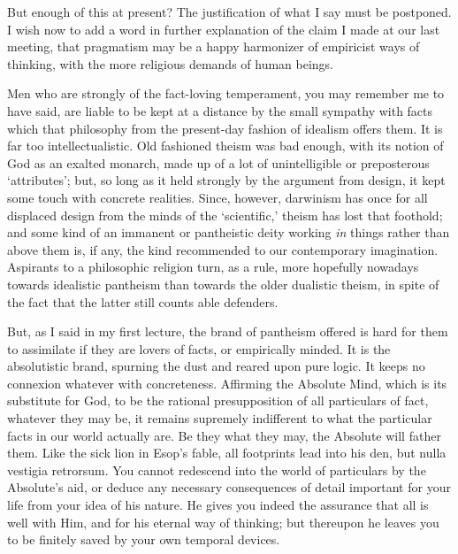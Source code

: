 \documentclass[]{article}
\begin{document}
But enough of this at present? The justification of what I say must be
postponed. I wish now to add a word in further explanation of the claim
I made at our last meeting, that pragmatism may be a happy harmonizer
of empiricist ways of thinking, with the more religious demands of human
beings.

Men who are strongly of the fact-loving temperament, you may remember me
to have said, are liable to be kept at a distance by the small sympathy
with facts which that philosophy from the present-day fashion of
idealism offers them. It is far too intellectualistic. Old fashioned
theism was bad enough, with its notion of God as an exalted monarch,
made up of a lot of unintelligible or preposterous `attributes'; but, so
long as it held strongly by the argument from design, it kept some touch
with concrete realities. Since, however, darwinism has once for all
displaced design from the minds of the `scientific,' theism has lost
that foothold; and some kind of an immanent or pantheistic deity working
\emph{in} things rather than above them is, if any, the kind recommended to our
contemporary imagination. Aspirants to a philosophic religion turn, as a
rule, more hopefully nowadays towards idealistic pantheism than towards
the older dualistic theism, in spite of the fact that the latter still
counts able defenders.

But, as I said in my first lecture, the brand of pantheism offered is
hard for them to assimilate if they are lovers of facts, or empirically
minded. It is the absolutistic brand, spurning the dust and reared upon
pure logic. It keeps no connexion whatever with concreteness. Affirming
the Absolute Mind, which is its substitute for God, to be the rational
presupposition of all particulars of fact, whatever they may be, it
remains supremely indifferent to what the particular facts in our world
actually are. Be they what they may, the Absolute will father them. Like
the sick lion in Esop's fable, all footprints lead into his den,
but nulla vestigia retrorsum. You cannot redescend into the world of
particulars by the Absolute's aid, or deduce any necessary consequences
of detail important for your life from your idea of his nature. He gives
you indeed the assurance that all is well with Him, and for his eternal
way of thinking; but thereupon he leaves you to be finitely saved by
your own temporal devices.
\end{document}
